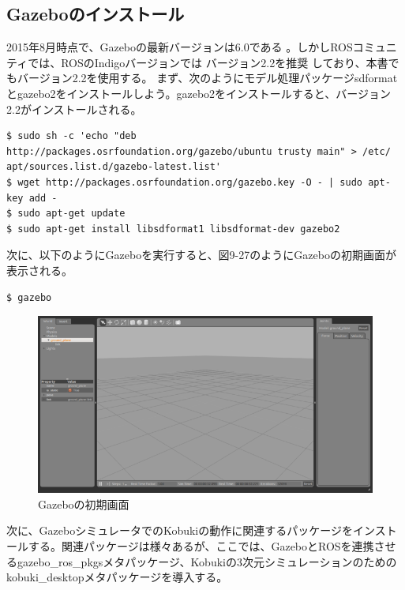 \begin{itemize}
\subsection{Gazeboのインストール}

2015年8月時点で、Gazeboの最新バージョンは6.0である  。しかしROSコミュニティでは、ROSのIndigoバージョンでは  バージョン2.2を推奨  しており、本書でもバージョン2.2を使用する。
まず、次のようにモデル処理パッケージsdformatとgazebo2をインストールしよう。gazebo2をインストールすると、バージョン2.2がインストールされる。

\begin{lstlisting}[language=ROS]
$ sudo sh -c 'echo "deb http://packages.osrfoundation.org/gazebo/ubuntu trusty main" > /etc/ apt/sources.list.d/gazebo-latest.list'
$ wget http://packages.osrfoundation.org/gazebo.key -O - | sudo apt-key add -
$ sudo apt-get update
$ sudo apt-get install libsdformat1 libsdformat-dev gazebo2
\end{lstlisting}

次に、以下のようにGazeboを実行すると、図9-27のようにGazeboの初期画面が表示される。

\begin{lstlisting}[language=ROS]
$ gazebo
\end{lstlisting}

\begin{figure}[ht]
  \centering
  \includegraphics[width=\columnwidth]{pictures/chapter9/pic_09_27.png}
  \caption{Gazeboの初期画面}
\end{figure}

次に、GazeboシミュレータでのKobukiの動作に関連するパッケージをインストールする。関連パッケージは様々あるが、ここでは、GazeboとROSを連携させるgazebo\_ros\_pkgsメタパッケージ、Kobukiの3次元シミュレーションのためのkobuki\_desktopメタパッケージを導入する。


\end{itemize}
